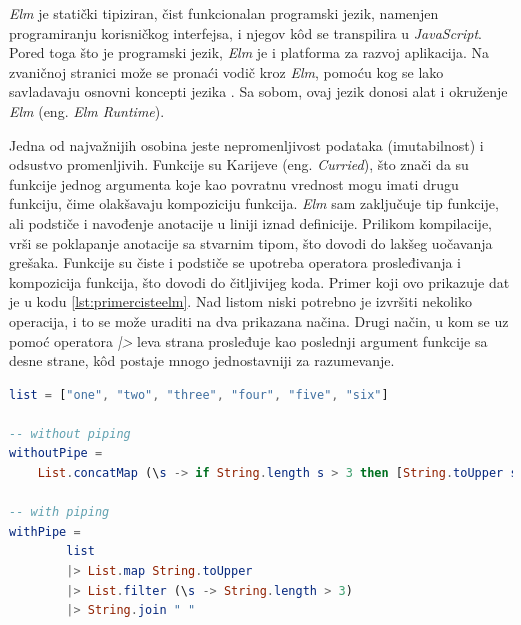 \documentclass[12pt,oneside]{memoir}
\begin{document}
\par \emph{Elm} je statički tipiziran, čist funkcionalan programski jezik, namenjen programiranju korisničkog interfejsa, i njegov k\^{o}d se transpilira u \emph{JavaScript}. Pored toga što je programski jezik, \emph{Elm} je i platforma za razvoj aplikacija. Na zvaničnoj stranici može se pronaći vodič kroz \emph{Elm}, pomoću kog se lako savladavaju osnovni koncepti jezika \cite{elm-lang-official}. Sa sobom, ovaj jezik donosi alat i okruženje \emph{Elm} (eng. \emph{Elm Runtime}). 
\par Jedna od najvažnijih osobina jeste nepromenljivost podataka (imutabilnost) i odsustvo promenljivih. Funkcije su Karijeve (eng. \emph{Curried}), što znači da su funkcije jednog argumenta koje kao povratnu vrednost mogu imati drugu funkciju, čime olakšavaju kompoziciju funkcija. \emph{Elm} sam zaključuje tip funkcije, ali podstiče i navođenje anotacije u liniji iznad definicije. Prilikom kompilacije, vrši se poklapanje anotacije sa stvarnim tipom, što dovodi do lakšeg uočavanja grešaka. Funkcije su čiste i podstiče se upotreba operatora prosleđivanja i kompozicija funkcija, što dovodi do čitljivijeg koda. Primer koji ovo prikazuje dat je u kodu \ref{lst:primercisteelm}. Nad listom niski potrebno je izvršiti nekoliko operacija, i to se može uraditi na dva prikazana načina. Drugi način, u kom se uz pomoć operatora \emph{|>} leva strana prosleđuje kao poslednji argument funkcije sa desne strane, k\^{o}d postaje mnogo jednostavniji za razumevanje. \\


\begin{minipage}{\linewidth}
\begin{lstlisting}[language=elm, basicstyle=\small, caption={Primer kompozicije funkcija upotrebom operatora prosleđivanja \\ },captionpos=b, label={lst:primercisteelm}]
list = ["one", "two", "three", "four", "five", "six"]

-- without piping
withoutPipe =
    List.concatMap (\s -> if String.length s > 3 then [String.toUpper s] else []) list
 
-- with piping
withPipe =
        list
        |> List.map String.toUpper
        |> List.filter (\s -> String.length > 3)
        |> String.join " "
\end{lstlisting}
\end{minipage}
\par
\end{document}

